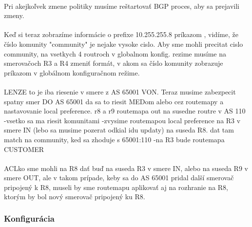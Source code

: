 \documentclass[12pt,twoside,a4paper]{report}
\begin{document}
\paragraph{}
Pri akejkoľvek zmene politiky musíme reštartovať BGP proces, aby sa prejavili zmeny.

\paragraph{}
Keď si teraz zobrazíme informácie o prefixe 10.255.255.8 príkazom , vidíme, že číslo komunity "community" je nejake vysoke cislo. Aby sme mohli precitat cislo community, na vsetkych 4 routroch v globalnom konfig. rezime musíme na smerovačoch R3 a R4 zmeniť formát, v akom sa číslo komunity zobrazuje príkazom  v globálnom konfiguračnom režime.

\paragraph{}
LENZE to je iba riesenie v smere z AS 65001 VON. Teraz musime zabezpecit spatny smer DO AS 65001
da sa to riesit MEDom alebo cez routemapy a nastavovanie local preference.
r8 a r9 routemapa out na susedne routre v AS 110
-vsetko sa ma riesit komunitami
-zvysime routemapou local preference na R3 v smere IN (lebo sa musime pozerat odkial idu updaty) na suseda R8. dat tam match na community, ked sa zhoduje s 65001:110
-na R3 bude routemapa CUSTOMER

\paragraph{}
ACLko  sme mohli na R8 dať buď na suseda R3 v smere IN, alebo na suseda R9 v smere OUT, ale v takom prípade, keby sa do AS 65001 pridal další smerovač pripojený k R8, museli by sme routemapu aplikovať aj na rozhranie na R8, ktorým by bol nový smerovač pripojený ku R8.


\subsubsection{Konfigurácia}
\paragraph{}
\end{document}
